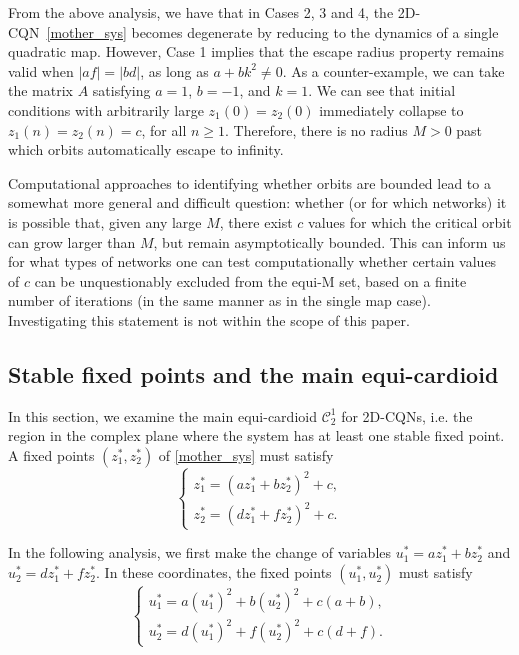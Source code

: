 \documentclass[10pt]{article}
\begin{document}
From the above analysis, we have that in Cases 2, 3 and 4, the 2D-CQN~\eqref{mother_sys} becomes degenerate by reducing to the dynamics of a single quadratic map. However, Case 1 implies that the escape radius property remains valid when $|a f| = |b d|$, as long as $a + b k^2 \neq 0$. As a counter-example, we can take the matrix $A$ satisfying $a = 1$, $b = -1$, and $k = 1$. We can see that initial conditions with arbitrarily large $z_1(0) = z_2(0)$ immediately collapse to $z_1(n) = z_2(n) = c$, for all $n \geq 1$. Therefore, there is no radius $M > 0$ past which orbits automatically escape to infinity.

\vspace{3mm}
 Computational approaches to identifying whether orbits are bounded lead to a somewhat more general and difficult question: whether (or for which networks) it is possible that, given any large $M$, there exist $c$ values for which the critical orbit can grow larger than $M$, but remain asymptotically bounded. This can inform us for what types of networks one can test computationally whether certain values of $c$ can be unquestionably excluded from the equi-M set, based on a finite number of iterations (in the same manner as in the single map case). Investigating this statement is not within the scope of this paper.


\subsection{Stable fixed points and the main equi-cardioid}
\label{cardioid}

In this section, we examine the main equi-cardioid $\mathcal{C}^1_2$ for 2D-CQNs, i.e. the region in the complex plane where the system has at least one stable fixed point.
A fixed points $(z_1^*, z_2^*)$ of \eqref{mother_sys} must satisfy
\[
\begin{cases}
z_1^* = (a z_1^* + b z_2^*)^2 + c, \\
z_2^* = (d z_1^* + f z_2^*)^2 + c.
\end{cases}
\]

In the following analysis, we first make the change of variables $u_1^* = a z_1^* + b z_2^*$ and $u_2^* = d z_1^* + f z_2^*$. In these coordinates, the fixed points $(u_1^*, u_2^*)$ must satisfy
\begin{equation} \label{eq.fixed.point}
\begin{cases}
u_1^* = a (u_1^*)^2 + b (u_2^*)^2 + c (a + b), \\
u_2^* = d (u_1^*)^2 + f (u_2^*)^2 + c (d + f).
\end{cases}
\end{equation}
\end{document}
